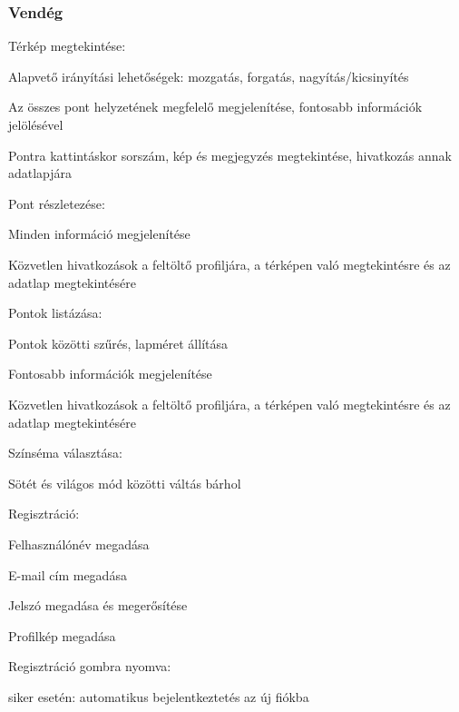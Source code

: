 \subsubsection{Vendég}
\begin{compactitem}
	\item Térkép megtekintése:
		\begin{compactitem}
			\item Alapvető irányítási lehetőségek: mozgatás, forgatás, nagyítás/kicsinyítés
			\item Az összes pont helyzetének megfelelő megjelenítése, fontosabb információk jelölésével
			\item Pontra kattintáskor sorszám, kép és megjegyzés megtekintése, hivatkozás annak adatlapjára
		\end{compactitem}
	\item Pont részletezése:
		\begin{compactitem}
			\item Minden információ megjelenítése
			\item Közvetlen hivatkozások a feltöltő profiljára, a térképen való megtekintésre és az adatlap megtekintésére
		\end{compactitem}
	\item Pontok listázása:
		\begin{compactitem}
			\item Pontok közötti szűrés, lapméret állítása
			\item Fontosabb információk megjelenítése
			\item Közvetlen hivatkozások a feltöltő profiljára, a térképen való megtekintésre és az adatlap megtekintésére
		\end{compactitem}
	\item Színséma választása:
		\begin{compactitem}
			\item Sötét és világos mód közötti váltás bárhol 
		\end{compactitem}
	\item Regisztráció:
	\begin{compactitem}
		\item Felhasználónév megadása
		\item E-mail cím megadása
		\item Jelszó megadása és megerősítése
		\item Profilkép megadása
		\item Regisztráció gombra nyomva:
		\begin{compactitem}
			\item siker esetén: automatikus bejelentkeztetés az új fiókba

\end{compactitem}
\end{compactitem}
\end{compactitem}
